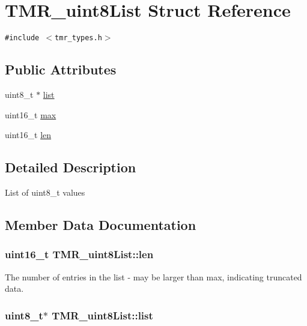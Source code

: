 \hypertarget{struct_t_m_r__uint8_list}{
\section{TMR\_\-uint8List Struct Reference}
\label{struct_t_m_r__uint8_list}
}
{\tt \#include $<$tmr\_\-types.h$>$}

\subsection*{Public Attributes}
\begin{CompactItemize}
\item 
uint8\_\-t $\ast$ \hyperlink{struct_t_m_r__uint8_list_dcef944c7adc55972fcd0f2d009ae6e9}{list}
\item 
uint16\_\-t \hyperlink{struct_t_m_r__uint8_list_8530bb9c74b5dc9ac3d213ff5ab98f7d}{max}
\item 
uint16\_\-t \hyperlink{struct_t_m_r__uint8_list_2aec69553ae1efca86a0256ffeca6ae2}{len}
\end{CompactItemize}


\subsection{Detailed Description}
List of uint8\_\-t values 

\subsection{Member Data Documentation}
\hypertarget{struct_t_m_r__uint8_list_2aec69553ae1efca86a0256ffeca6ae2}{
\subsubsection[{len}]{\setlength{\rightskip}{0pt plus 5cm}uint16\_\-t {\bf TMR\_\-uint8List::len}}}
\label{struct_t_m_r__uint8_list_2aec69553ae1efca86a0256ffeca6ae2}


The number of entries in the list - may be larger than max, indicating truncated data. \hypertarget{struct_t_m_r__uint8_list_dcef944c7adc55972fcd0f2d009ae6e9}{
\subsubsection[{list}]{\setlength{\rightskip}{0pt plus 5cm}uint8\_\-t$\ast$ {\bf TMR\_\-uint8List::list}}}
\label{struct_t_m_r__uint8_list_dcef944c7adc55972fcd0f2d009ae6e9}


